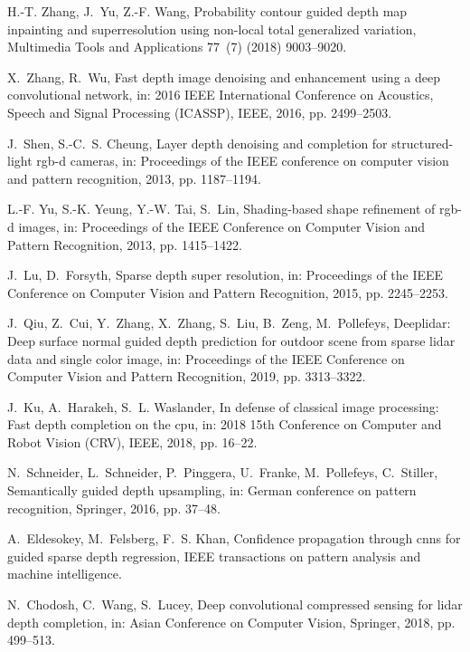 \documentclass[5p]{elsarticle}
\begin{document}
\begin{thebibliography}{100}
H.-T. Zhang, J.~Yu, Z.-F. Wang, Probability contour guided depth map inpainting
  and superresolution using non-local total generalized variation, Multimedia
  Tools and Applications 77~(7) (2018) 9003--9020.

X.~Zhang, R.~Wu, Fast depth image denoising and enhancement using a deep
  convolutional network, in: 2016 IEEE International Conference on Acoustics,
  Speech and Signal Processing (ICASSP), IEEE, 2016, pp. 2499--2503.

J.~Shen, S.-C.~S. Cheung, Layer depth denoising and completion for
  structured-light rgb-d cameras, in: Proceedings of the IEEE conference on
  computer vision and pattern recognition, 2013, pp. 1187--1194.

L.-F. Yu, S.-K. Yeung, Y.-W. Tai, S.~Lin, Shading-based shape refinement of
  rgb-d images, in: Proceedings of the IEEE Conference on Computer Vision and
  Pattern Recognition, 2013, pp. 1415--1422.

J.~Lu, D.~Forsyth, Sparse depth super resolution, in: Proceedings of the IEEE
  Conference on Computer Vision and Pattern Recognition, 2015, pp. 2245--2253.

J.~Qiu, Z.~Cui, Y.~Zhang, X.~Zhang, S.~Liu, B.~Zeng, M.~Pollefeys, Deeplidar:
  Deep surface normal guided depth prediction for outdoor scene from sparse
  lidar data and single color image, in: Proceedings of the IEEE Conference on
  Computer Vision and Pattern Recognition, 2019, pp. 3313--3322.

J.~Ku, A.~Harakeh, S.~L. Waslander, In defense of classical image processing:
  Fast depth completion on the cpu, in: 2018 15th Conference on Computer and
  Robot Vision (CRV), IEEE, 2018, pp. 16--22.

N.~Schneider, L.~Schneider, P.~Pinggera, U.~Franke, M.~Pollefeys, C.~Stiller,
  Semantically guided depth upsampling, in: German conference on pattern
  recognition, Springer, 2016, pp. 37--48.

A.~Eldesokey, M.~Felsberg, F.~S. Khan, Confidence propagation through cnns for
  guided sparse depth regression, IEEE transactions on pattern analysis and
  machine intelligence.

N.~Chodosh, C.~Wang, S.~Lucey, Deep convolutional compressed sensing for lidar
  depth completion, in: Asian Conference on Computer Vision, Springer, 2018,
  pp. 499--513.


\end{thebibliography}
\end{document}
